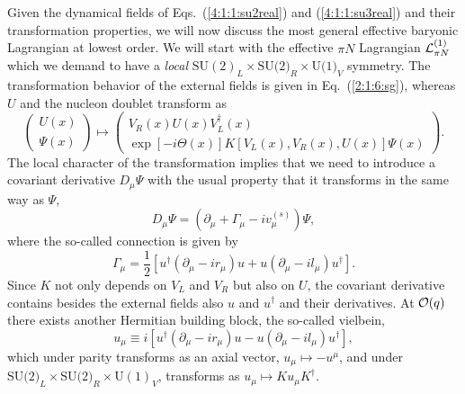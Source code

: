 \documentclass[twoside,12pt]{article}
\begin{document}
   Given the dynamical fields of Eqs.\ (\ref{4:1:1:su2real}) and
(\ref{4:1:1:su3real}) and their transformation properties, we will now discuss
the most general effective baryonic Lagrangian at lowest order.
   We will start with the effective $\pi N$ Lagrangian
${\cal L}^{(1)}_{\pi N}$ which we demand to have a {\em local}
$\mbox{SU}(2)_L\times\mbox{SU(2)}_R\times\mbox{U(1)}_V$ symmetry.
   The transformation behavior of the external fields is given in
Eq.\ (\ref{2:1:6:sg}), whereas $U$ and the nucleon doublet transform as
\begin{equation}
\label{4:1:2:psitrans}
\left(\begin{array}{c}U(x)\\ \Psi(x)\end{array}\right)\mapsto
\left(\begin{array}{c}V_R(x)U(x)V_L^\dagger(x)\\
\exp[-i\Theta(x)]K[V_L(x),V_R(x),U(x)]\Psi(x)\end{array}\right).
\end{equation}
   The local character of the transformation implies that we need to
introduce a covariant derivative $D_\mu \Psi$ with the usual property that
it transforms in the same way as $\Psi$,
\begin{equation}
\label{4:1:2:kovder}
D_\mu\Psi=(\partial_\mu+\Gamma_\mu-iv_\mu^{(s)})\Psi,
\end{equation}
where the so-called connection is given by
\begin{equation}
\label{4:1:2:gamma}
\Gamma_\mu=\frac{1}{2}\left[u^\dagger(\partial_\mu-ir_\mu)u
+u(\partial_\mu-il_\mu)u^\dagger\right].
\end{equation}
   Since $K$ not only depends on $V_L$ and $V_R$ but also on $U$,
the covariant derivative contains besides the external fields also
$u$ and $u^\dagger$ and their derivatives.
   At ${\cal O}(q)$ there exists another Hermitian building block,
the so-called vielbein,
\begin{equation}
\label{4:1:2:chvi}
u_\mu\equiv i\left[u^\dagger(\partial_\mu-i r_\mu)u-u(\partial_\mu-i
l_\mu)u^\dagger\right],
\end{equation}
which under parity transforms as an axial vector, $u_\mu\mapsto -u^\mu$,
and under $\mbox{SU(2)}_L\times\mbox{SU(2)}_R\times \mbox{U}(1)_V$,
transforms as $u_\mu \mapsto Ku_\mu K^\dagger$.
\end{document}
